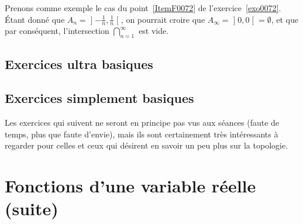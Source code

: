 Prenons comme exemple le cas du point~\ref{ItemF0072} de l'exercice~\ref{exo0072}. Étant donné que $A_n=\mathopen]-\frac{1}{ n },\frac{1}{ n }\mathclose[$, on pourrait croire que $A_{\infty}=\mathopen]0,0\mathclose[=\emptyset$, et que par conséquent, l'intersection $\bigcap_{n=1}^{\infty}$ est vide.

					\subsection{Exercices ultra basiques}



					\subsection{Exercices simplement basiques}

Les exercices qui suivent ne seront en principe pas vus aux séances (faute de temps, plus que faute d'envie), mais ils sont certainement très intéressants à regarder pour celles et ceux qui désirent en savoir un peu plus sur la topologie.



					\section{Fonctions d'une variable réelle (suite)}



